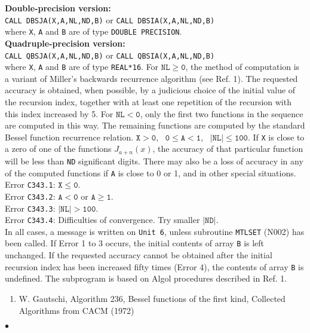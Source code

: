{\bf Double-precision version:} \\[2mm]
\hspace*{8mm} {\tt CALL DBSJA(X,A,NL,ND,B)} \qquad or \qquad
              {\tt CALL DBSIA(X,A,NL,ND,B)}  \\[2mm]
where {\tt X}, {\tt A} and {\tt B} are of type {\tt DOUBLE PRECISION}.
\\[2mm]
{\bf Quadruple-precision version:} \\[2mm]
\hspace*{8mm} {\tt CALL QBSJA(X,A,NL,ND,B)} \qquad or \qquad
              {\tt CALL QBSIA(X,A,NL,ND,B)}  \\[2mm]
where {\tt X}, {\tt A} and {\tt B} are of type {\tt REAL*16}.
\Method
For $\mathtt{NL \geq 0}$, the method of computation is a variant
of Miller's backwards recurrence algorithm (see Ref. 1). The
requested accuracy is obtained, when possible, by a
judicious choice of the initial value of the recursion index,
together with at least one repetition of the recursion with this index
increased by 5.
For $\mathtt{NL < 0}$, only the first two functions in the sequence are
computed in this way. The remaining functions are computed by the
standard Bessel function recurrence relation.
\newpage
\Restrict
$\mathtt{X > 0}$, \ $\mathtt{0 \leq A < 1}$, \ $\mathtt{|NL| \leq 100}$.
\Accuracy
If {\tt X} is close to a zero of one of the functions $J_{a+n}(x)$,
the accuracy of that particular function will be less than {\tt ND}
significant digits.
There may also be a loss of accuracy in any of the computed functions
if {\tt A} is close to 0 or 1, and in other special situations.
\Errorh
Error {\tt C343.1}: $\mathtt{X \le 0}$.\\
Error {\tt C343.2}: $\mathtt{A<0}$ or $\mathtt{A \ge 1}$. \\
Error {\tt C343.3}: $\mathtt{|NL|>100}$. \\
Error {\tt C343.4}: Difficulties of convergence. Try smaller
$\mathtt{|ND|}$.\\
In all cases, a message is written on
{\tt Unit 6}, unless subroutine {\tt MTLSET} (N002) has been called.
If Error 1 to 3 occurs, the initial contents of array {\tt B}
is left unchanged.
If the requested accuracy cannot be obtained after the initial
recursion index has been increased fifty times (Error 4),
the contents of array {\tt B} is undefined.
\Source
The subprogram is based on Algol procedures described in Ref. 1.
\Refer
\begin{enumerate}
\item W. Gautschi, Algorithm 236, Bessel functions of the first kind,
 Collected Algorithms from CACM (1972)
\end{enumerate}
$\bullet$
